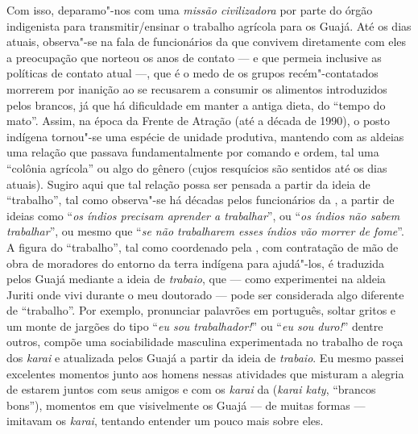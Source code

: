 Com isso, deparamo"-nos com uma \emph{missão civilizadora} por parte do
órgão indigenista para transmitir/ensinar o trabalho agrícola para os
Guajá. Até os dias atuais, observa"-se na fala de funcionários da 
que convivem diretamente com eles a preocupação que norteou os anos de
contato --- e que permeia inclusive as políticas de contato atual ---, que é
o medo de os grupos recém"-contatados morrerem por inanição ao se
recusarem a consumir os alimentos introduzidos pelos brancos, já que há
dificuldade em manter a antiga dieta, do ``tempo do mato''. Assim, na
época da Frente de Atração (até a década de 1990), o posto indígena
tornou"-se uma espécie de unidade produtiva, mantendo com as aldeias uma
relação que passava fundamentalmente por comando e ordem, tal uma
``colônia agrícola'' ou algo do gênero (cujos resquícios são sentidos
até os dias atuais). Sugiro aqui que tal relação possa ser pensada a
partir da ideia de ``trabalho'', tal como observa"-se há décadas pelos
funcionários da , a partir de ideias como ``\emph{os índios
precisam aprender a trabalhar}'', ou ``\emph{os índios não sabem
trabalhar}'', ou mesmo que ``\emph{se não trabalharem esses índios vão
morrer de fome}''. A figura do ``trabalho'', tal como coordenado pela
, com contratação de mão de obra de moradores do entorno da terra
indígena para ajudá"-los, é traduzida pelos Guajá mediante a ideia de
\emph{trabaio}, que --- como experimentei na aldeia Juriti onde vivi
durante o meu doutorado --- pode ser considerada algo diferente de
``trabalho''. Por exemplo, pronunciar palavrões em português, soltar
gritos e um monte de jargões do tipo ``\emph{eu sou trabalhador!}'' ou
``\emph{eu sou duro!}'' dentre outros, compõe uma sociabilidade
masculina experimentada no trabalho de roça dos \emph{karai} e
atualizada pelos Guajá a partir da ideia de \emph{trabaio}. Eu mesmo
passei excelentes momentos junto aos homens nessas atividades que
misturam a alegria de estarem juntos com seus amigos e com os
\emph{karai} da  (\emph{karai katy}, ``brancos bons''), momentos em
que visivelmente os Guajá --- de muitas formas --- imitavam os \emph{karai},
tentando entender um pouco mais sobre eles.

